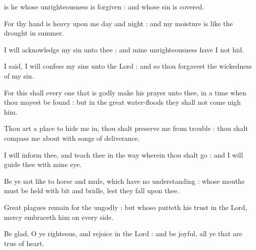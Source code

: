  is he whose unrighteousness is forgiven : and whose sin is covered.\par
{}
For thy hand is heavy upon me day and night : and my moisture is like the drought in summer.\par
{}I will acknowledge my sin unto thee : and mine unrighteousness have I not hid.\par
{}I said, I will confess my sins unto the Lord : and so thou forgavest the wickedness of my sin.\par
{}For this shall every one that is godly make his prayer unto thee, in a time when thou mayest be found : but in the great water-floods they shall not come nigh him.\par
{}Thou art a place to hide me in, thou shalt preserve me from trouble : thou shalt compass me about with songs of deliverance.\par
{}I will inform thee, and teach thee in the way wherein thou shalt go : and I will guide thee with mine eye.\par
{}Be ye not like to horse and mule, which have no understanding : whose mouths must be held with bit and bridle, lest they fall upon thee.\par
{}Great plagues remain for the ungodly : but whoso putteth his trust in the Lord, mercy embraceth him on every side.\par
{}Be glad, O ye righteous, and rejoice in the Lord : and be joyful, all ye that are true of heart.\par


